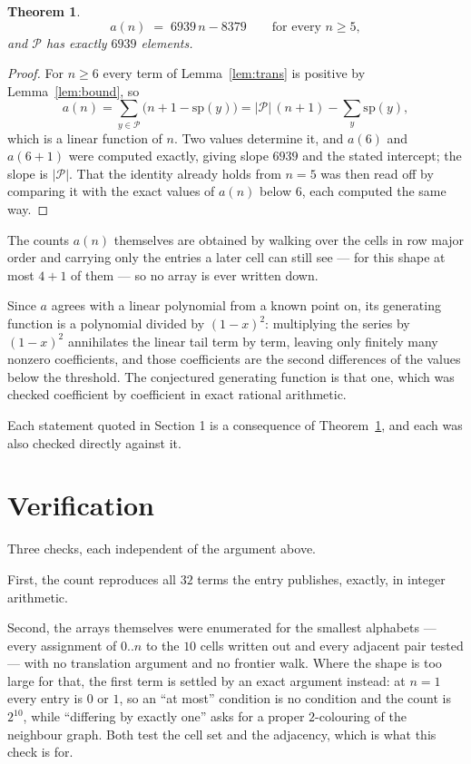 \documentclass[11pt,a4paper]{article}
\theoremstyle{plain}
\newtheorem{theorem}{Theorem}
\theoremstyle{definition}
\begin{document}
\begin{theorem}\label{thm:line}
\[
a(n)\;=\;6939\,n-8379\qquad\text{for every }n\ge5,
\]
and $\mathcal P$ has exactly $6939$ elements.
\end{theorem}

\begin{proof}
For $n\ge6$ every term of Lemma~\ref{lem:trans} is positive by
Lemma~\ref{lem:bound}, so
\[
a(n)=\sum_{y\in\mathcal P}\bigl(n+1-\mathrm{sp}(y)\bigr)
=|\mathcal P|\,(n+1)-\sum_{y}\mathrm{sp}(y),
\]
which is a linear function of $n$. Two values determine it, and $a(6)$ and
$a(6+1)$ were computed exactly, giving slope $6939$ and the stated intercept; the slope
is $|\mathcal P|$. That the identity already holds from $n=5$ was then read off by
comparing it with the exact values of $a(n)$ below $6$, each computed the same way.
\end{proof}

The counts $a(n)$ themselves are obtained by walking over the cells in row major order and
carrying only the entries a later cell can still see --- for this shape at most $4+1$ of
them --- so no array is ever written down.

Since $a$ agrees with a linear polynomial from a known point on, its generating function is a
polynomial divided by $(1-x)^2$: multiplying the series by $(1-x)^2$ annihilates the linear
tail term by term, leaving only finitely many nonzero coefficients, and those coefficients are
the second differences of the values below the threshold. The conjectured generating function
is that one, which was checked coefficient by coefficient in exact rational arithmetic.

Each statement quoted in Section 1 is a consequence of Theorem~\ref{thm:line}, and each was
also checked directly against it.

\section{Verification}

Three checks, each independent of the argument above.

First, the count reproduces all $32$ terms the entry publishes, exactly, in integer
arithmetic.

Second, the arrays themselves were enumerated for the smallest alphabets --- every assignment
of $0..n$ to the $10$ cells written out and every adjacent pair tested --- with no
translation argument and no frontier walk. Where the shape is too large for that, the first
term is settled by an exact argument instead: at $n=1$ every entry is $0$ or $1$, so an ``at
most'' condition is no condition and the count is $2^{10}$, while ``differing by exactly
one'' asks for a proper $2$-colouring of the neighbour graph. Both test the cell set and the
adjacency, which is what this check is for.
\end{document}
